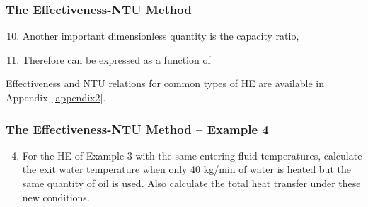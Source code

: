 \documentclass[10pt,compress,unknownkeysallowed]{beamer}
\begin{document}
\begin{frame}
  \frametitle{The Effectiveness-NTU Method}
     \begin{enumerate}\setcounter{enumi}{9}
          \item<1-> Another important dimensionless quantity is the capacity ratio,
          \item<2-> Therefore  can be expressed as a function of
         
     \end{enumerate}
 
     Effectiveness and NTU relations for common types of HE are available in Appendix~\ref{appendix2}.

\end{frame}

\begin{frame}
  \frametitle{ The Effectiveness-NTU Method -- Example 4}
      \begin{enumerate}\setcounter{enumi}{3}
         \item For the HE of Example 3 with the same entering-fluid temperatures, calculate the exit water temperature when only 40 kg/min of water is heated but the same quantity of oil is used. Also calculate the total heat transfer under these new conditions.
      \end{enumerate}
\end{frame}
\end{document}
